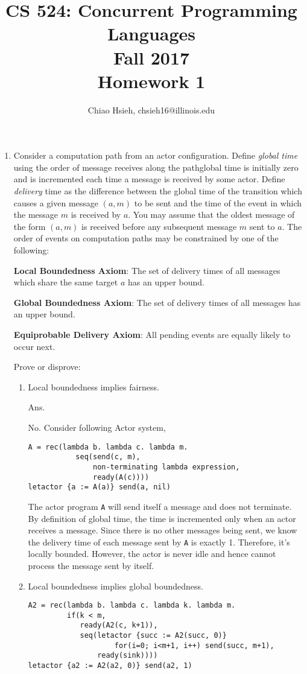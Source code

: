 \documentclass{article}
\title{\Large\bfseries
CS 524: Concurrent Programming Languages \\
Fall 2017 \\
Homework 1}
\author{Chiao Hsieh, chsieh16@illinois.edu}
\begin{document}
\maketitle

\begin{enumerate}
\item Consider a computation path from an actor configuration.
Define \textit{global time} using the order of message receives along the
path\textemdash global time is initially zero and is incremented each time a
message is received by some actor.
Define \textit{delivery} time as the difference between the global time of the
transition which causes a given message $(a, m)$ to be sent and the time of 
the event in which the message $m$ is received by $a$.
You may assume that the oldest message of the form $(a, m)$ is received before
any subsequent message $m$ sent to $a$.
The order of events on computation paths may be constrained by one of the 
following:

\textbf{Local Boundedness Axiom}: 
The set of delivery times of all messages which share the same target $a$ has 
an upper bound.

\textbf{Global Boundedness Axiom}:
The set of delivery times of all messages has an upper bound.

\textbf{Equiprobable Delivery Axiom}:
All pending events are equally likely to occur next.

Prove or disprove:
\begin{enumerate}
\item Local boundedness implies fairness.

Ans.

No. Consider following Actor system,
\begin{verbatim}
A = rec(lambda b. lambda c. lambda m.
           seq(send(c, m),
               non-terminating lambda expression,
               ready(A(c))))
letactor {a := A(a)} send(a, nil)
\end{verbatim}
The actor program \texttt{A} will send itself a message and does not
terminate. By definition of global time, the time is incremented only when an
actor receives a message. Since there is no other messages being sent, we
know the delivery time of each message sent by \texttt{A} is exactly 1. 
Therefore, it's locally bounded. However, the actor is never idle and hence 
cannot process the message sent by itself.

\item Local boundedness implies global boundedness.
\begin{verbatim}
A2 = rec(lambda b. lambda c. lambda k. lambda m.
         if(k < m,
            ready(A2(c, k+1)),
            seq(letactor {succ := A2(succ, 0)}
                    for(i=0; i<m+1, i++) send(succ, m+1),
                ready(sink))))
letactor {a2 := A2(a2, 0)} send(a2, 1)
\end{verbatim}


\end{enumerate}
\end{enumerate}
\end{document}
